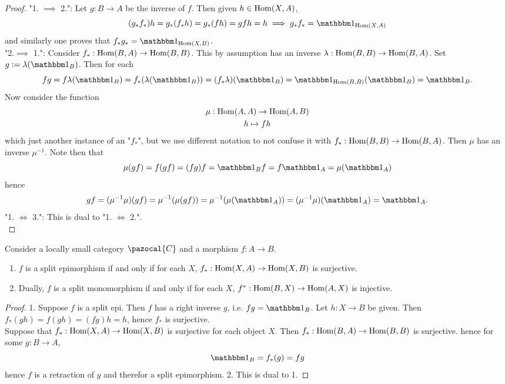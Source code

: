 \begin{proof}
    "1. $\implies$ 2.": Let $g : B\rightarrow A$ be the inverse of $f$. Then given $h\in \mathrm{Hom}(X,A)$,
    $$(g_\ast f_\ast)h = g_\ast(f_\ast h)= g_\ast(fh)=gfh=h \implies g_\ast f_\ast = \fone_{\Hom(X,A)}$$
    and similarly one proves that $f_\ast g_\ast = \fone_{\Hom(X,B)}$.\\
    "2.$\implies$ 1.": Consider $f_\ast : \mathrm{Hom}(B,A)\rightarrow \mathrm{Hom}(B,B)$. This by assumption has an inverse $\lambda : \mathrm{Hom}(B,B)\rightarrow \mathrm{Hom}(B,A)$. Set $g := \lambda(\fone_B)$. Then for each  
    $$fg = f \lambda(\fone_B)= f_\ast(\lambda(\fone_B))=(f_\ast\lambda)(\fone_B)=\fone_{\Hom(B,B)}(\fone_B)=\fone_B.$$
    Now consider the function 
    \begin{gather*}
        \mu : \mathrm{Hom}(A,A)\rightarrow \mathrm{Hom}(A,B)\\
        h\mapsto fh
    \end{gather*}
    which just another instance of an "$f_\ast$", but we use different notation to not confuse it with $f_\ast: \mathrm{Hom}(B,B)\rightarrow \mathrm{Hom}(B,A)$. Then $\mu$ has an inverse $\mu^{-1}$. Note then that
    $$
        \mu(gf)= f(gf)=(fg)f= \fone_B f = f\fone_A= \mu(\fone_A)
    $$
    hence 
    $$
        gf = (\mu^{-1}\mu)(gf) = \mu^{-1}(\mu(gf)) = \mu^{-1}(\mu(\fone_A))= (\mu^{-1}\mu)(\fone_A) = \fone_A.
    $$
    "1. $\iff$ 3.": This is dual to "1. $\iff$ 2.".\\
\end{proof}
\begin{lemma}
    Consider a locally small category $\pazocal{C}$ and a morphism $f:A\rightarrow B$.
    \begin{enumerate}
        \item $f$ is a split epimorphism if and only if for each $X$, $f_\ast: \mathrm{Hom}(X,A) \rightarrow \mathrm{Hom}(X,B)$ is surjective. 
        \item Dually, $f$ is a split monomorphism if and only if for each $X$, $f^\ast : \mathrm{Hom}(B,X)\rightarrow \mathrm{Hom}(A,X)$ is injective. 
    \end{enumerate}
\end{lemma}
\begin{proof}
    1. Suppose $f$ is a split epi. Then $f$ has a right inverse $g$, i.e. $fg = \fone_B$. Let $h: X \rightarrow B$ be given. Then $f_\ast(gh)= f(gh)=(fg)h = h$, hence $f_\ast$ is surjective.\\ 
    Suppose that $f_\ast: \mathrm{Hom}(X,A)\rightarrow \mathrm{Hom}(X,B)$ is surjective for each object $X$. Then $f_\ast: \mathrm{Hom}(B,A) \rightarrow \mathrm{Hom}(B,B)$ is surjective. hence for some $g:B\rightarrow A$, 
    $$
        \fone_B=f_\ast(g) = fg
    $$ 
    hence $f$ is a retraction of $g$ and therefor a split epimorphism. 
    2. This is dual to 1. 
\end{proof}
